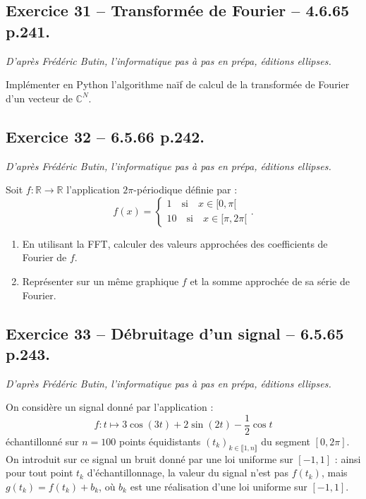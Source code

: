 \documentclass[10pt,fleqn]{article} %
\begin{document}
\begin{multicols}{2}
\subsection*{Exercice 31 -- Transformée de Fourier -- 4.6.65 p.241.}
\begin{flushright}
\textit{D'après Frédéric Butin, l'informatique pas à pas en prépa, éditions ellipses.}
\end{flushright}
Implémenter en Python l'algorithme naïf de calcul de la transformée de Fourier d'un vecteur de $\mathbb{C}^N$.

\subsection*{Exercice 32 -- 6.5.66 p.242.}
\begin{flushright}
\textit{D'après Frédéric Butin, l'informatique pas à pas en prépa, éditions ellipses.}
\end{flushright}
Soit $f:\mathbb{R} \to \mathbb{R}$ l'application $2\pi$-périodique définie par :
$$
f(x)=\left\{
\begin{array}{l}
1  \quad \text{si} \quad x\in[0,\pi[ \\
10  \quad \text{si} \quad x\in[\pi,2\pi[
\end{array}
\right. .
$$
\begin{enumerate}
\item En utilisant la FFT, calculer des valeurs approchées des coefficients de Fourier de $f$. 
\item Représenter sur un même graphique $f$ et la somme approchée de sa série de Fourier.
\end{enumerate}

\subsection*{Exercice 33 -- Débruitage d'un signal -- 6.5.65 p.243.}
\begin{flushright}
\textit{D'après Frédéric Butin, l'informatique pas à pas en prépa, éditions ellipses.}
\end{flushright}
On considère un signal donné par l'application :
$$
f:t \mapsto 3 \cos \left( 3t\right)+2\sin \left( 2t\right)-\dfrac{1}{2}\cos t
$$
échantillonné sur $n=100$  points équidistants $(t_k)_{k\in \llbracket 1,n\rrbracket}$ du segment $[0,2\pi]$. On introduit sur ce signal un bruit donné par une loi uniforme sur $[-1,1]$ : ainsi pour tout point $t_k$ d'échantillonnage, la valeur du signal n'est pas $f(t_k)$, mais $g(t_k) = f(t_k) + b_k$, où $b_k$ est une réalisation d'une loi uniforme sur $[-1,1]$.


\end{multicols}
\end{document}
